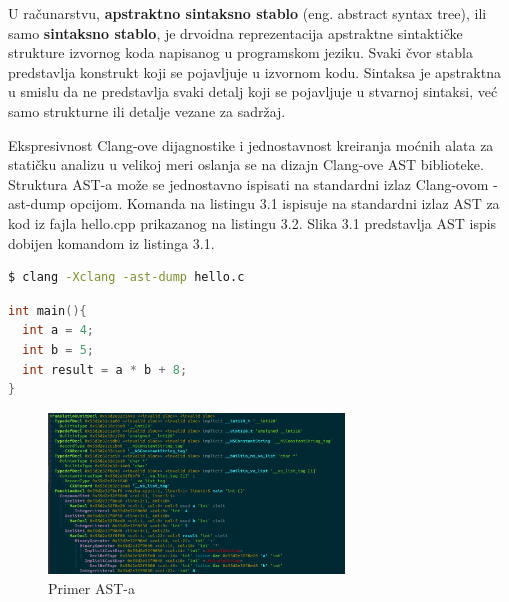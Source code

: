 \documentclass[12pt,oneside]{memoir}
\begin{document}
U računarstvu, \textbf{apstraktno sintaksno stablo} (eng. abstract syntax tree), ili samo \textbf{sintaksno stablo}, je drvoidna reprezentacija apstraktne sintaktičke strukture izvornog koda napisanog u programskom jeziku. Svaki čvor stabla predstavlja konstrukt koji se pojavljuje u izvornom kodu.
Sintaksa je apstraktna u smislu da ne predstavlja svaki detalj koji se pojavljuje u stvarnoj sintaksi, već samo strukturne ili detalje vezane za sadržaj.

Ekspresivnost Clang-ove dijagnostike i jednostavnost kreiranja mo\'{c}nih alata za stati\v{c}ku analizu u velikoj meri oslanja se na dizajn Clang-ove AST biblioteke. Struktura AST-a mo\v{z}e  se jednostavno ispisati na standardni izlaz Clang-ovom -ast-dump opcijom. Komanda na listingu 3.1 ispisuje na standardni izlaz AST za kod iz fajla hello.cpp prikazanog na listingu 3.2. Slika 3.1 predstavlja AST ispis dobijen komandom iz listinga 3.1.
\\

\begin{lstlisting}[caption={Komanda za ispisivanje Clang-ovog AST-a},label={lst:label},language=bash, captionpos=b]
$ clang -Xclang -ast-dump hello.c
\end{lstlisting}

\begin{lstlisting}[caption={Kod \v{c}iji je AST prikazan na slici 4.1},label={lst:label},language=C++, captionpos=b]
int main(){
  int a = 4;
  int b = 5;
  int result = a * b + 8;
}
\end{lstlisting}

\begin{figure}[!ht]
  \centering
  \includegraphics[width=0.7\textwidth]{ASTImage.png}
  \caption{Primer AST-a}
  \label{fig:grafikon}
\end{figure}
\end{document}
